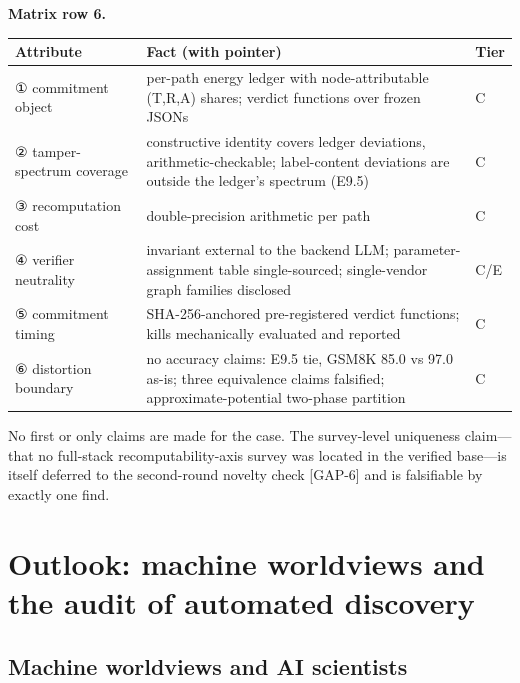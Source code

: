 \documentclass[11pt,a4paper]{article}
\begin{document}
\noindent\textbf{Matrix row 6.}

\begin{table}[htbp]
\centering
\footnotesize
\setlength{\tabcolsep}{3.5pt}
\renewcommand{\arraystretch}{1.18}
\begin{tabularx}{0.985\textwidth}{>{\raggedright\arraybackslash}p{} >{\raggedright\arraybackslash}X >{\raggedright\arraybackslash}p{}}
\toprule
\textbf{Attribute} & \textbf{Fact (with pointer)} & \textbf{Tier} \\
\midrule
① commitment object & per-path energy ledger with node-attributable (T,R,A) shares; verdict functions over frozen JSONs \cite{key04} & C \\
② tamper-spectrum coverage & constructive identity covers ledger deviations, arithmetic-checkable; label-content deviations are outside the ledger's spectrum (E9.5) \cite{key04} & C \\
③ recomputation cost & double-precision arithmetic per path \cite{key04} & C \\
④ verifier neutrality & invariant external to the backend LLM; parameter-assignment table single-sourced; single-vendor graph families disclosed \cite{key04} & C\slash E \\
⑤ commitment timing & SHA-256-anchored pre-registered verdict functions; kills mechanically evaluated and reported \cite{key04} & C \\
⑥ distortion boundary & no accuracy claims: E9.5 tie, GSM8K 85.0 vs 97.0 as-is; three equivalence claims falsified; approximate-potential two-phase partition \cite{key04} & C \\
\bottomrule
\end{tabularx}
\end{table}

No first or only claims are made for the case. The survey-level uniqueness claim—that no full-stack recomputability-axis survey was located in the verified base—is itself deferred to the second-round novelty check [GAP-6] and is falsifiable by exactly one find.

\section{Outlook: machine worldviews and the audit of automated discovery}

\subsection{Machine worldviews and AI scientists}
\end{document}
